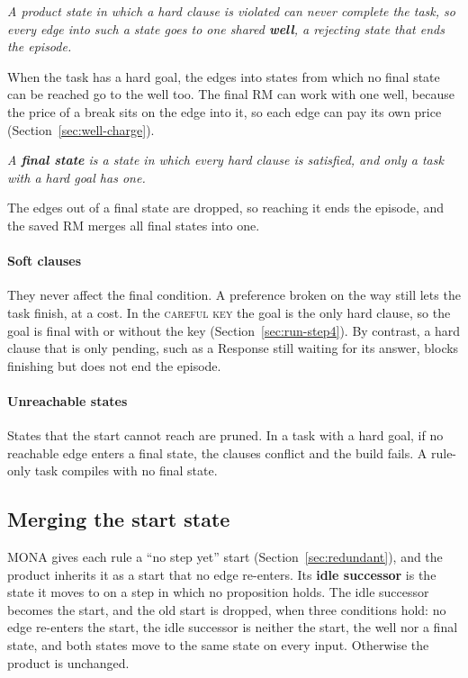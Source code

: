 \documentclass[11pt,english,listoffigures,listoftables]{tfgetsinf}
\newcommand{\runex}[1]{\textsc{#1}}  %
\newcommand{\keyidea}[1]{\par\smallskip\noindent\hspace*{0.6em}{\color{gray!55}\vrule width 1.5pt}\hspace{8pt}\parbox[t]{\dimexpr\linewidth-0.6em-9.5pt\relax}{\itshape #1}\par\smallskip}  %
\begin{document}
\keyidea{A product state in which a hard clause is violated can never complete the task, so every edge into such a state goes to one shared \textbf{well}, a rejecting state that ends the episode.}

\noindent When the task has a hard goal, the edges into states from which no final state can be reached go to the well too. The final RM can work with one well, because the price of a break sits on the edge into it, so each edge can pay its own price (Section~\ref{sec:well-charge}).

\keyidea{A \textbf{final state} is a state in which every hard clause is satisfied, and only a task with a hard goal has one.}

The edges out of a final state are dropped, so reaching it ends the episode, and the saved RM merges all final states into one.

\paragraph{Soft clauses} They never affect the final condition. A preference broken on the way still lets the task finish, at a cost. In the \runex{careful key} the goal is the only hard clause, so the goal is final with or without the key (Section~\ref{sec:run-step4}). By contrast, a hard clause that is only pending, such as a Response still waiting for its answer, blocks finishing but does not end the episode.

\paragraph{Unreachable states} States that the start cannot reach are pruned. In a task with a hard goal, if no reachable edge enters a final state, the clauses conflict and the build fails. A rule-only task compiles with no final state.

\subsection{Merging the start state}
\label{sec:start-merge}
MONA gives each rule a ``no step yet'' start (Section~\ref{sec:redundant}), and the product inherits it as a start that no edge re-enters. Its \textbf{idle successor} is the state it moves to on a step in which no proposition holds. The idle successor becomes the start, and the old start is dropped, when three conditions hold: no edge re-enters the start, the idle successor is neither the start, the well nor a final state, and both states move to the same state on every input. Otherwise the product is unchanged.
\end{document}
